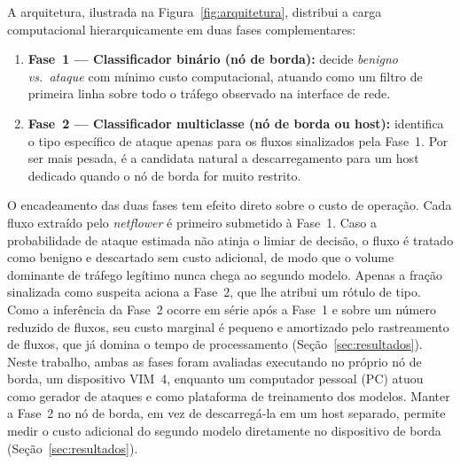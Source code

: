 \documentclass[12pt]{article}
\begin{document}
A arquitetura, ilustrada na Figura~\ref{fig:arquitetura}, distribui a carga
computacional hierarquicamente em duas fases complementares:

\begin{enumerate}
  \item \textbf{Fase~1 — Classificador binário (nó de borda):} decide
    \textit{benigno vs.\ ataque} com mínimo custo computacional, atuando como um
    filtro de primeira linha sobre todo o tráfego observado na interface de rede.
  \item \textbf{Fase~2 — Classificador multiclasse (nó de borda ou host):}
    identifica o tipo específico de ataque apenas para os fluxos sinalizados pela
    Fase~1. Por ser mais pesada, é a candidata natural a descarregamento para um
    host dedicado quando o nó de borda for muito restrito.
\end{enumerate}

O encadeamento das duas fases tem efeito direto sobre o custo de operação. Cada
fluxo extraído pelo \textit{netflower} é primeiro submetido à Fase~1. Caso  a
probabilidade de ataque estimada não atinja o limiar de decisão, o fluxo é
tratado como benigno e descartado sem custo adicional, de modo que o volume
dominante de tráfego legítimo nunca chega ao segundo modelo. Apenas a fração
sinalizada como suspeita aciona a Fase~2, que lhe atribui um rótulo de tipo. Como a inferência da Fase~2 ocorre em série após a Fase~1 e sobre um número reduzido de fluxos, seu custo marginal é pequeno e amortizado pelo rastreamento de fluxos, que já domina o tempo de processamento (Seção~\ref{sec:resultados}). Neste trabalho, ambas as fases foram avaliadas executando no próprio nó de
borda, um dispositivo VIM~4, enquanto um computador pessoal (PC) atuou como
gerador de ataques e como plataforma de treinamento dos modelos. Manter a Fase~2
no nó de borda, em vez de descarregá-la em um host separado, permite medir o
custo adicional do segundo modelo diretamente no dispositivo de borda
(Seção~\ref{sec:resultados}).
\end{document}
